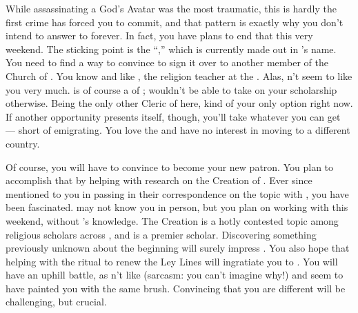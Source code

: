 \documentclass[char]{GL2020}
\begin{document}
While assassinating a God's Avatar was the most traumatic, this is hardly the first crime \cAntiChup{} has forced you to commit, and that pattern is exactly why you don't intend to answer to \cAntiChup{} forever. In fact, you have plans to end that this very weekend. The sticking point is the ``\iScholarship{},'' which is currently made out in \cAntiChup{}'s name. You need to find a way to convince \cAntiChup{} to sign it over to another member of the Church of \cTechGod{}. You know and like \cBeetle{\full}, the religion teacher at the \pSc{}. Alas, \cBeetle{\theydo}n't seem to like you very much. \cBeetle{} is of course a \cBeetle{\cleric} of \cTechGod{}; \cBeetle{\they} wouldn't be able to take on your scholarship otherwise. Being the only other Cleric of \cTechGod{} here, \cBeetle{\theyare} kind of your only option right now. If another opportunity presents itself, though, you'll take whatever you can get — short of emigrating. You love the \pTech{} and have no interest in moving to a different country. 

Of course, you will have to convince \cBeetle{} to become your new patron. You plan to accomplish that by helping \cEbbPriest{\full} with \cEbbPriest{\their} research on the Creation of \pEarth{}. Ever since \cAntiChup{} mentioned to you in passing in their correspondence on the topic with \cEbbPriest{}, you have been fascinated. \cEbbPriest{} may not know you in person, but you plan on working with \cEbbPriest{\them} this weekend, without \cAntiChup{}’s knowledge. The Creation is a hotly contested topic among religious scholars across \pEarth{}, and \cBeetle{} is a premier scholar. Discovering something previously unknown about the beginning will surely impress \cBeetle{\them}. You also hope that helping with the ritual to renew the Ley Lines will ingratiate you to \cBeetle{}. You will have an uphill battle, as \cBeetle{\theydo}n't like \cAntiChup{} (sarcasm: you can't imagine why!) and seem\cBeetle{\verbs} to have painted you with the same brush. Convincing \cBeetle{\them} that you are different will be challenging, but crucial.
\end{document}
